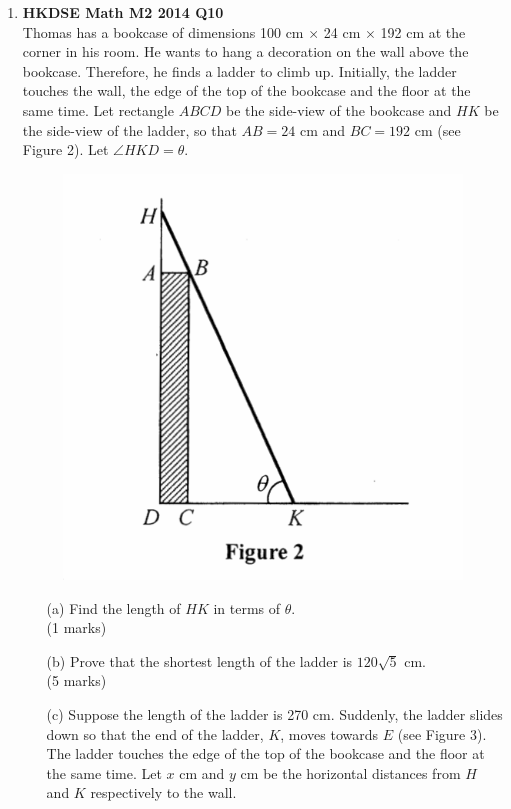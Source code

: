 \documentclass[12pt]{article}
\begin{document}
\begin{enumerate}
	\item \textbf{HKDSE Math M2 2014 Q10}\\
	Thomas has a bookcase of dimensions 100 cm $\times$ 24 cm $\times$ 192 cm at the corner in his room. He wants to hang a decoration on the wall above the bookcase. Therefore, he finds a ladder to climb up. Initially, the ladder touches the wall, the edge of the top of the bookcase and the floor at the same time. Let rectangle $ABCD$ be the side-view of the bookcase and $HK$ be the side-view of the ladder, so that $AB = 24$ cm and $BC = 192$ cm (see Figure 2). Let $\angle HKD = \theta$. 
	\begin{figure}[H]
		\centering
		\includegraphics{2014Figure2}
	\end{figure}
	\begin{enumerate}
		\item [(a)]Find the length of $HK$ in terms of $\theta$. \\(1 marks)
		\item [(b)]Prove that the shortest length of the ladder is $120\sqrt{5}$ cm. \\(5 marks)
		\item [(c)]
		Suppose the length of the ladder is 270 cm. Suddenly, the ladder slides down so that the end of the ladder, $K$, moves towards $E$ (see Figure 3). The ladder touches the edge of the top of the bookcase and the floor at the same time. Let $x$ cm and $y$ cm be the horizontal distances from $H$ and $K$ respectively to the wall.

\end{enumerate}
\end{enumerate}
\end{document}
